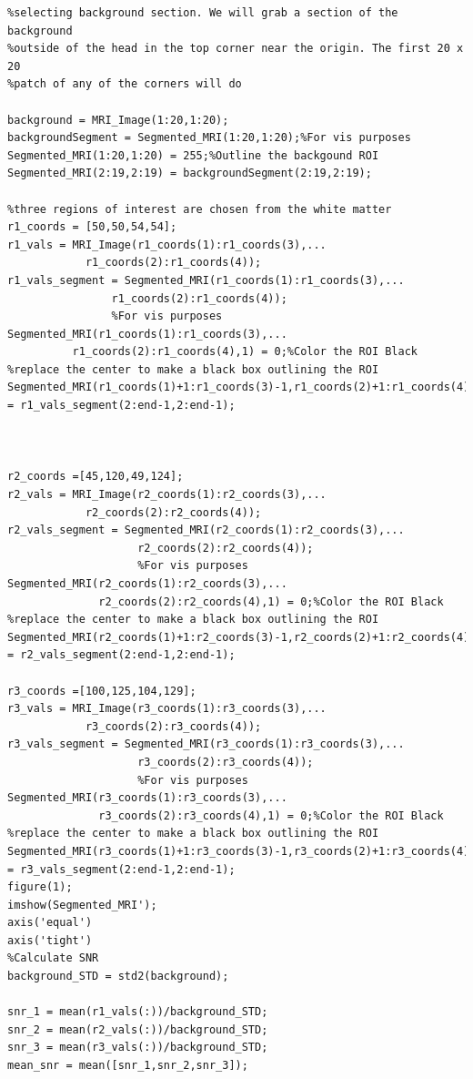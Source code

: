 \documentclass[12pt]{article}
\begin{document}
\begin{lstlisting}[style=Matlab-editor]
%%
%selecting background section. We will grab a section of the background
%outside of the head in the top corner near the origin. The first 20 x 20
%patch of any of the corners will do

background = MRI_Image(1:20,1:20);
backgroundSegment = Segmented_MRI(1:20,1:20);%For vis purposes
Segmented_MRI(1:20,1:20) = 255;%Outline the backgound ROI
Segmented_MRI(2:19,2:19) = backgroundSegment(2:19,2:19);

%three regions of interest are chosen from the white matter
r1_coords = [50,50,54,54];
r1_vals = MRI_Image(r1_coords(1):r1_coords(3),...
		    r1_coords(2):r1_coords(4));
r1_vals_segment = Segmented_MRI(r1_coords(1):r1_coords(3),...
				r1_coords(2):r1_coords(4));
				%For vis purposes
Segmented_MRI(r1_coords(1):r1_coords(3),...
	      r1_coords(2):r1_coords(4),1) = 0;%Color the ROI Black
%replace the center to make a black box outlining the ROI
Segmented_MRI(r1_coords(1)+1:r1_coords(3)-1,r1_coords(2)+1:r1_coords(4)-1) = r1_vals_segment(2:end-1,2:end-1);



r2_coords =[45,120,49,124];
r2_vals = MRI_Image(r2_coords(1):r2_coords(3),...
		    r2_coords(2):r2_coords(4));
r2_vals_segment = Segmented_MRI(r2_coords(1):r2_coords(3),...
		  	        r2_coords(2):r2_coords(4));
		  	        %For vis purposes
Segmented_MRI(r2_coords(1):r2_coords(3),...
      	      r2_coords(2):r2_coords(4),1) = 0;%Color the ROI Black
%replace the center to make a black box outlining the ROI
Segmented_MRI(r2_coords(1)+1:r2_coords(3)-1,r2_coords(2)+1:r2_coords(4)-1) = r2_vals_segment(2:end-1,2:end-1);

r3_coords =[100,125,104,129];
r3_vals = MRI_Image(r3_coords(1):r3_coords(3),...
		    r3_coords(2):r3_coords(4));
r3_vals_segment = Segmented_MRI(r3_coords(1):r3_coords(3),...
		      		r3_coords(2):r3_coords(4));
		      		%For vis purposes
Segmented_MRI(r3_coords(1):r3_coords(3),...
              r3_coords(2):r3_coords(4),1) = 0;%Color the ROI Black
%replace the center to make a black box outlining the ROI
Segmented_MRI(r3_coords(1)+1:r3_coords(3)-1,r3_coords(2)+1:r3_coords(4)-1) = r3_vals_segment(2:end-1,2:end-1);
figure(1);
imshow(Segmented_MRI');
axis('equal')
axis('tight')
%Calculate SNR
background_STD = std2(background);

snr_1 = mean(r1_vals(:))/background_STD;
snr_2 = mean(r2_vals(:))/background_STD;
snr_3 = mean(r3_vals(:))/background_STD;
mean_snr = mean([snr_1,snr_2,snr_3]);
\end{lstlisting}
\vspace{-.3in}
\end{document}
